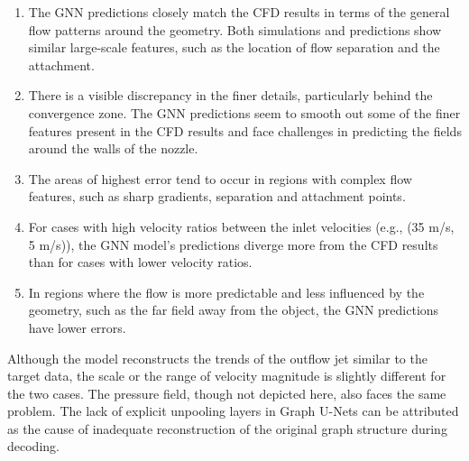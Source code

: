 \begin{enumerate}
\item The GNN predictions closely match the CFD results in terms of the general flow patterns around the geometry. Both simulations and predictions show similar large-scale features, such as the location of flow separation and the attachment.
\item There is a visible discrepancy in the finer details, particularly behind the convergence zone. The GNN predictions seem to smooth out some of the finer features present in the CFD results and face challenges in predicting the fields around the walls of the nozzle.  
\item The areas of highest error tend to occur in regions with complex flow features, such as sharp gradients, separation and attachment points.
\item For cases with high velocity ratios between the inlet velocities (e.g., (35 m/s, 5 m/s)), the GNN model's predictions diverge more from the CFD results than for cases with lower velocity ratios. 
\item  In regions where the flow is more predictable and less influenced by the geometry, such as the far field away from the object, the GNN predictions have lower errors.
\end{enumerate}
Although the model reconstructs the trends of the outflow jet similar to the target data, the scale or the range of velocity magnitude is slightly different for the two cases. The pressure field, though not depicted here, also faces the same problem. The lack of explicit unpooling layers in Graph U-Nets can be attributed as the cause of inadequate reconstruction of the original graph structure during decoding. 
